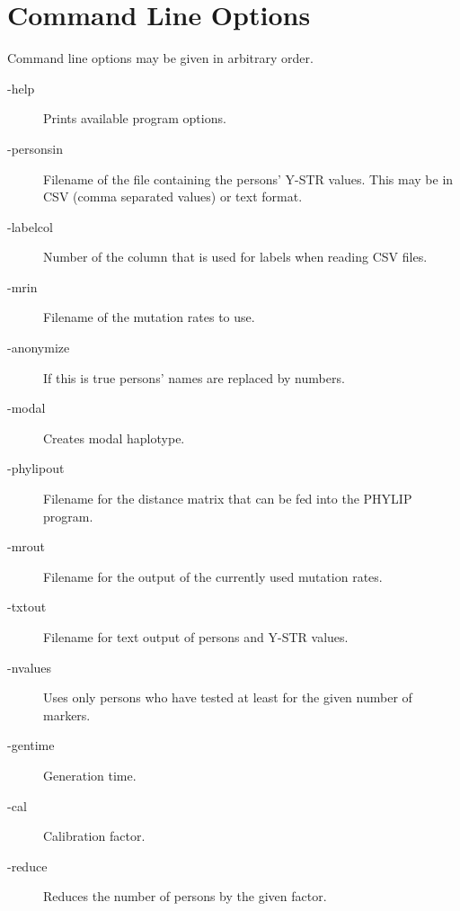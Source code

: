 \section{Command Line Options}

Command line options may be given in arbitrary order.

\begin{description}
\item[-help] Prints available program options.
\item[-personsin] Filename of the file containing the persons' Y-STR values.
	This may be in CSV (comma separated values) or text format.
\item[-labelcol] Number of the column that is used for labels
	when reading CSV files.
\item[-mrin] Filename of the mutation rates to use.
\item[-anonymize] If this is true persons' names are replaced by numbers.
\item[-modal] Creates modal haplotype.
\item[-phylipout] Filename for the distance matrix that can be fed into
	the PHYLIP\cite{Phylip} program.
\item[-mrout] Filename for the output of the currently used mutation rates.
\item[-txtout] Filename for text output of persons and Y-STR values.
\item[-nvalues] Uses only persons who have tested at least for the given number of markers.
\item[-gentime] Generation time.
\item[-cal] Calibration factor.
\item[-reduce] Reduces the number of persons by the given factor.
\end{description}

